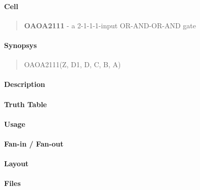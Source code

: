 \label{OAOA2111}
\paragraph{Cell}
\begin{quote}
    \textbf{OAOA2111} - a 2-1-1-1-input OR-AND-OR-AND gate
\end{quote}

\paragraph{Synopsys}
\begin{quote}
    OAOA2111(Z, D1, D, C, B, A)
\end{quote}

\paragraph{Description}

%

\paragraph{Truth Table}
%

\paragraph{Usage}

\paragraph{Fan-in / Fan-out}

\paragraph{Layout}

\paragraph{Files}
